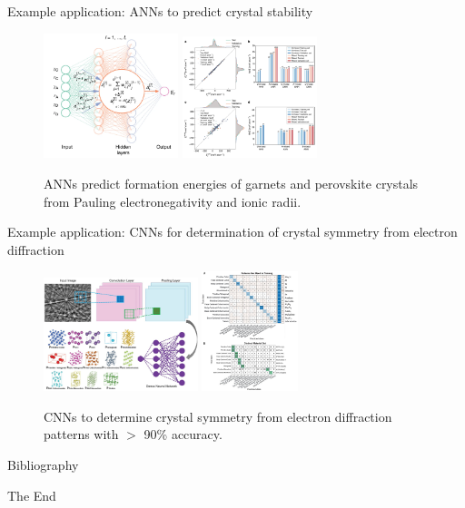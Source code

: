 \documentclass[aspectratio=169]{beamer}
\begin{document}
\begin{frame}{Example application: ANNs to predict crystal stability}
\begin{figure}
    \centering
    \includegraphics[width=0.35\textwidth]{figures/dnn-crystal-stability.png}
    \includegraphics[width=0.35\textwidth]{figures/dnn-crystal-stability2.png}
    \caption{ANNs predict formation energies of garnets and perovskite crystals from Pauling electronegativity and ionic radii.\cite{yeDeepNeuralNetworks2018}}
\end{figure}
\end{frame}


\begin{frame}{Example application: CNNs for determination of crystal symmetry from electron diffraction}
\begin{figure}
    \centering
    \includegraphics[width=0.4\textwidth]{figures/science-cnn-electron-diffraction.jpg}
    \includegraphics[width=0.25\textwidth]{figures/science-cnn-electron-diffraction2.jpg}
    \caption{CNNs to determine crystal symmetry from electron diffraction patterns with $>$ 90\% accuracy.\cite{kaufmannCrystalSymmetryDetermination2020}}
\end{figure}
\end{frame}


\begin{frame}[allowframebreaks]{Bibliography}
    
    
\end{frame}


\begin{frame}
    \Huge{\centerline{The End}}
\end{frame}
\end{document}
